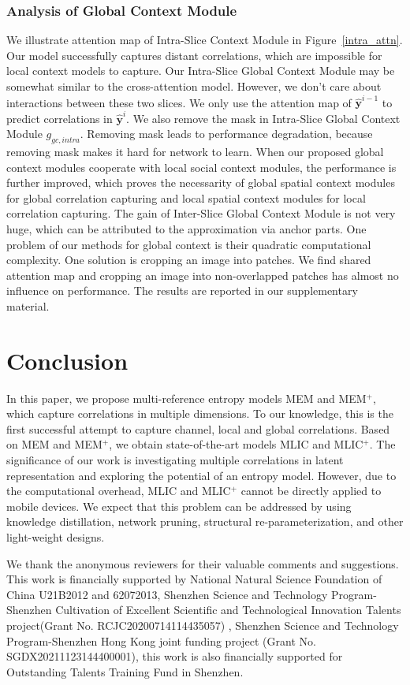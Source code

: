 \documentclass[sigconf]{acmart}
\begin{document}
\subsubsection{Analysis of Global Context Module}
We illustrate attention map of Intra-Slice Context Module in Figure~\ref{intra_attn}.
Our model successfully captures distant correlations,
which are impossible for local context models to capture.
Our Intra-Slice Global Context Module may be somewhat similar to the cross-attention model.
However, we don't care about interactions between these two slices.
We only use the attention map of $\hat {\boldsymbol{y}}^{i-1}$ to predict correlations in $\hat {\boldsymbol{y}}^i$.
We also remove the mask in Intra-Slice Global Context Module $g_{gc, intra}$.
Removing mask leads to performance degradation, because removing mask
makes it hard for network to learn.
When our proposed global context modules cooperate with local social context modules,
the performance is further improved, which proves the necessarity of
global spatial context modules for global correlation capturing and local spatial
context modules for local correlation capturing.
The gain of Inter-Slice Global Context Module is not very huge,
which can be attributed to the approximation via anchor parts.
One problem of our methods for global context is their quadratic computational complexity.
One solution is cropping an image into patches.
We find shared attention map and cropping an image into non-overlapped patches has almost no influence on performance.
The results are reported in our supplementary material.
\section{Conclusion}\label{Sec:conclusion}
In this paper, we propose multi-reference entropy models MEM and MEM$^+$,
which capture correlations in multiple dimensions. To our knowledge,
this is the first successful attempt to capture channel, local and global correlations.
Based on MEM and MEM$^+$, we obtain state-of-the-art models MLIC and MLIC$^+$.
The significance of our work is investigating multiple correlations
in latent representation and exploring the potential of an entropy model.
However, due to the computational overhead, MLIC and MLIC$^+$ cannot be directly
applied to mobile devices. We expect that this problem can be addressed by
using knowledge distillation, network pruning, structural re-parameterization,
and other light-weight designs.
\begin{acks}
We thank the anonymous reviewers for their valuable comments and suggestions.
This work is financially supported by National Natural Science Foundation of China U21B2012 and  62072013, Shenzhen Science and Technology Program-Shenzhen Cultivation of Excellent Scientific and Technological Innovation Talents project(Grant No. RCJC20200714114435057) , Shenzhen Science and Technology Program-Shenzhen Hong Kong joint funding project (Grant No. SGDX20211123144400001), this work is also financially supported for Outstanding Talents Training Fund in Shenzhen.
\end{acks}
\end{document}
